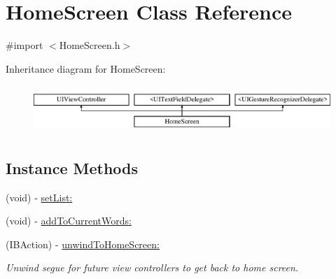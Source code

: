 \hypertarget{interface_home_screen}{\section{Home\+Screen Class Reference}
\label{interface_home_screen}
}


{\ttfamily \#import $<$Home\+Screen.\+h$>$}

Inheritance diagram for Home\+Screen\+:\begin{figure}[H]
\begin{center}
\leavevmode
\includegraphics[height=1.839080cm]{interface_home_screen}
\end{center}
\end{figure}
\subsection*{Instance Methods}
\begin{DoxyCompactItemize}
\item 
(void) -\/ \hyperlink{interface_home_screen_ab9b671da97168db6cdd909c218c92993}{set\+List\+:}
\item 
(void) -\/ \hyperlink{interface_home_screen_ab853965f7ba5aa0f82000d71536253d6}{add\+To\+Current\+Words\+:}
\item 
(I\+B\+Action) -\/ \hyperlink{interface_home_screen_ae069215520c7cb301ab231c3c260389c}{unwind\+To\+Home\+Screen\+:}
\begin{DoxyCompactList}\small\item\em Unwind segue for future view controllers to get back to home screen. \end{DoxyCompactList}\end{DoxyCompactItemize}
